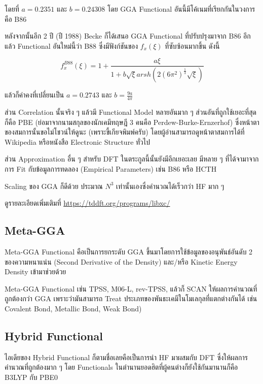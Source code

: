 \noindent โดยที่ $a = 0.2351$ และ $b = 0.24308$ โดย GGA Functional อันนี้มีโค้เนมที่เรียกกันในวงการคือ B86

หลังจากนั้นอีก 2 ปี (ปี 1988) Becke ก็ได้เสนอ GGA Functional ที่ปรับปรุงมาจาก B86 อีกแล้ว Functional
อันใหม่นี้ว่า B88 ซึ่งมีฟังก์ชันของ $f_{x}(\xi)$ ที่ซับซ้อนมากขึ้น ดังนี้ 

\begin{equation}
    f^{B88}_{x}(\xi) = 
    1 + \frac{a\xi}{1 + b\sqrt{\xi} arsh (2(6\pi^{2})^{\frac{1}{3}} \sqrt{\xi })}
\end{equation}

\noindent แล้วก็ค่าคงที่เปลี่ยนเป็น $a = 0.2743$ และ $b = \frac{9a}{4\pi}$

ส่วน Correlation นั้นจริง ๆ แล้วมี Functional Model หลายอันมาก ๆ ส่วนอันที่ถูกใช้เยอะที่สุดก็คือ PBE 
(ย่อมาจากนามสกุลของนักเคมีทฤษฎี 3 คนคือ Perdew-Burke-Ernzerhof) ซึ่งหน้าตาของสมการนั้นขอไม่โชวน์ให้ดูนะ
(เพราะขี้เกียจพิมพ์ครับ) โดยผู้อ่านสามารถดูหน้าตาสมการได้ที่ Wikipedia หรือหนังสือ Electronic Structure ทั่วไป 

ส่วน Approximation อื่น ๆ สำหรับ DFT ในตระกูลนี้นั้นยังมีอีกเยอะเลย มีหลาย ๆ ที่ได้จามาจากการ Fit กับข้อมูลการทดลอง 
(Empirical Parameters) เช่น B86 หรือ HCTH 

Scaling ของ GGA ก็ดีด้วย ประมาณ $N^{3}$ เท่านั้นเองซึ่งคำนวณได้เร็วกว่า HF มาก ๆ

ดูรายละเอียดเพิ่มเติมที่ \url{https://tddft.org/programs/libxc/}

\subsection{Meta-GGA}

Meta-GGA Functional คือเป็นการยกระดับ GGA ขึ้นมาโดยการใช้ข้อมูลของอนุพันธ์อันดับ 2 ของความหนาแน่น (Second 
Derivative of the Density) และ/หรือ Kinetic Energy Density เข้ามาช่วยด้วย 

Meta-GGA Functional เช่น TPSS, M06-L, rev-TPSS, แล้วก็ SCAN ให้ผลการคำนวณที่ถูกต้องกว่า GGA 
เพราะว่ามันสามารถ Treat ประเภทของพันธะเคมีในโมเลกุลที่แตกต่างกันได้ เช่น Covalent Bond, Metallic Bond, 
Weak Bond) 

\subsection{Hybrid Functional}

ไอเดียของ Hybrid Functional ก็ตามชื่อเลยคือเป็นการนำ HF มาผสมกับ DFT ซึ่งให้ผลการคำนวณที่ถูกต้องมาก ๆ 
โดย Functionals ในตำนานยอดฮิตที่ผู้คนต่างก็ยังใช้กันมานานก็คือ B3LYP กับ PBE0 

